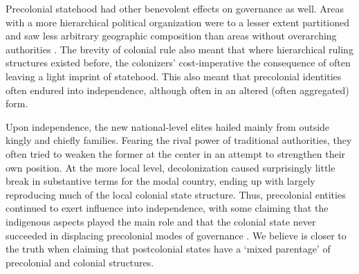 Precolonial statehood had other benevolent effects on governance as well. Areas
with a more hierarchical political organization were to a lesser extent
partitioned and saw less arbitrary geographic composition than areas without
overarching authorities \citep{Green2012,Nugent1996}. The brevity of colonial
rule also meant that where hierarchical ruling structures existed before, the
colonizers' cost-imperative the consequence of often leaving a light imprint of
statehood. This also meant that precolonial identities often endured into
independence, although often in an altered (often aggregated) form. 



Upon independence, the new national-level elites hailed mainly from outside
kingly and chiefly families. Fearing the rival power of traditional authorities,
they often tried to weaken the former at the center in an attempt to strengthen
their own position. At the more local level, decolonization caused surprisingly
little break in substantive terms for the modal country, ending up with largely
reproducing much of the local colonial state structure. Thus, precolonial
entities continued to exert influence into independence, with some claiming that
the indigenous aspects played the main role and that the colonial state never
succeeded in displacing precolonial modes of governance
\citep{ChabalPatrick1999Aw:d}. We believe \citet[22]{englebert2013inside} is
closer to the truth when claiming that postcolonial states have a `mixed
parentage' of precolonial and colonial structures.

